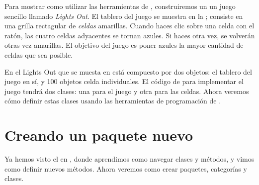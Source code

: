 \documentclass[a4paper,10pt,twoside]{book}
\begin{document}
Para mostrar como utilizar las herramientas de \pharo, construiremos un un juego
sencillo llamado \emph{Lights Out}. El tablero del juego se muestra en la ;
consiste en una grilla rectagular de \emph{celdas} amarillas. Cuando haces clic
sobre una celda con el rat\'on, las cuatro celdas adyacentes se tornan azules. Si
haces \Click otra vez, se volver\'an otras vez amarillas. El objetivo del juego
es poner azules la mayor cantidad de celdas que sea posible.

En el Lights Out que se muesta en  est\'a compuesto por
dos objetos: el tablero del juego en s\'i, y 100 objetos celda individuales. El
c\'odigo de \pharo para implementar el juego tendr\'a dos clases: una para el
juego y otra para las celdas. Ahora veremos c\'omo definir estas clases usando
las herramientas de programaci\'on de \pharo.

\section{Creando un paquete nuevo}

Ya hemos visto el  en , donde aprendimos como
navegar clases y m\'etodos, y vimos como definir nuevos m\'etodos. Ahora veremos
como crear paquetes, categor\'ias y clases.


\end{document}
